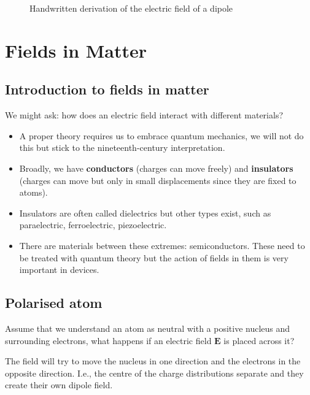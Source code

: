 \documentclass[12pt,chapterprefix=false,dvipsnames]{scrbook}
\theoremstyle{dotless}
\theoremstyle{definition}
\begin{document}
\begin{figure}[htpb]
	\centering
	
	\caption{Handwritten derivation of the electric field of a dipole}%
	\label{fig:derive_E_of_dipole}
\end{figure}

\chapter{Fields in Matter}%
\label{cha:fields_in_matter}

\section{Introduction to fields in matter}%
\label{sec:introduction_to_fields_in_matter}

We might ask: how does an electric field interact with different
materials?

\begin{itemize}
	\item A proper theory requires us to embrace quantum mechanics, we
	      will not do this but stick to the nineteenth-century
	      interpretation.
	\item Broadly, we have \textbf{conductors} (charges can move freely) and
	      \textbf{insulators} (charges can move but only in small displacements since they are fixed to atoms).
	\item Insulators are often called dielectrics but other types exist,
	      such as paraelectric, ferroelectric, piezoelectric.
	\item There are materials between these extremes: semiconductors.
	      These need to be treated with quantum theory but the action of
	      fields in them is very important in devices.
\end{itemize}

\section{Polarised atom}%
\label{sec:polarised_atom}

Assume that we understand an atom as neutral with a positive
nucleus and surrounding electrons, what happens if an electric
field $\bm{E}$ is placed across it?

The field will try to move the nucleus in one direction and the
electrons in the opposite direction. I.e., the centre of the
charge distributions separate and they create their own dipole
field.
\end{document}
